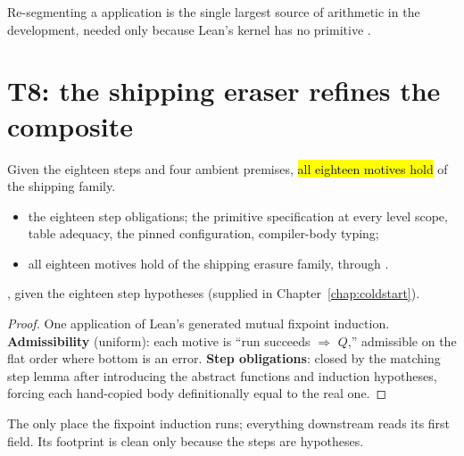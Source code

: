 \begin{remark}
 Re-segmenting a  application is the single largest source of arithmetic in the
development, needed only because Lean's kernel has no primitive .
\end{remark}

\section{T8: the shipping eraser refines the composite}
\label{sec:refinement:t8}

\begin{theorem}
\label{thm:motives_of_steps}
\leanok
{}
 Given the eighteen steps and four ambient premises, \hl{all eighteen motives hold} of the
shipping family.
\begin{itemize}
\item {} the eighteen step obligations; the primitive specification at every level scope,
table adequacy, the pinned configuration, compiler-body typing;
\item {} all eighteen motives hold of the shipping erasure family,  through
.
\end{itemize}
 \stProved{}, given the eighteen step hypotheses (supplied in Chapter~\ref{chap:coldstart}).
\end{theorem}
\begin{proof}
\leanok
{}
 One application of Lean's generated mutual fixpoint induction. \textbf{Admissibility}
(uniform): each motive is ``run succeeds $\Rightarrow$ $Q$,'' admissible on the flat order where bottom is
an error. \textbf{Step obligations}: closed by the matching step lemma after introducing the abstract
functions and induction hypotheses, forcing each hand-copied body definitionally equal to the real one.
\end{proof}

\begin{remark}
 The only place the fixpoint induction runs; everything downstream reads its first field.
Its footprint is clean only because the steps are hypotheses.
\end{remark}

